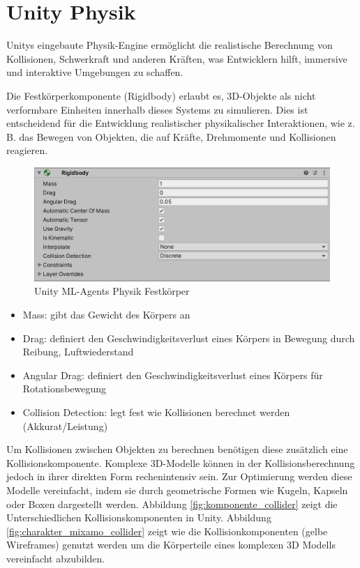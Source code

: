 \section{Unity Physik}
\label{sec:physik}
Unitys eingebaute Physik-Engine ermöglicht die realistische Berechnung von Kollisionen, Schwerkraft und anderen Kräften, was Entwicklern hilft, immersive und interaktive Umgebungen zu schaffen.

Die Festkörperkomponente (Rigidbody) erlaubt es, 3D-Objekte als nicht verformbare Einheiten innerhalb dieses Systems zu simulieren. Dies ist entscheidend für die Entwicklung realistischer physikalischer Interaktionen, wie z. B. das Bewegen von Objekten, die auf Kräfte, Drehmomente und Kollisionen reagieren.

\begin{figure}[H]
  \centering  
  \includegraphics[scale=0.5]{img/komponente_rigidbody.png}
  \caption{Unity ML-Agents Physik Festkörper}
  \label{fig:komponente_rigidbody}
\end{figure}
\begin{itemize}
  \item Mass: gibt das Gewicht des Körpers an
  \item Drag: definiert den Geschwindigkeitsverlust eines Körpers in Bewegung durch Reibung, Luftwiederstand
  \item Angular Drag: definiert den Geschwindigkeitsverlust eines Körpers für Rotationsbewegung
  \item Collision Detection: legt fest wie Kollisionen berechnet werden (Akkurat/Leistung)
 \end{itemize}
 
Um Kollisionen zwischen Objekten zu berechnen benötigen diese zusätzlich eine Kollisionskomponente. Komplexe 3D-Modelle können in der Kollisionsberechnung jedoch in ihrer direkten Form rechenintensiv sein. Zur Optimierung werden diese Modelle vereinfacht, indem sie durch geometrische Formen wie Kugeln, Kapseln oder Boxen dargestellt werden. Abbildung \ref{fig:komponente_collider} zeigt die Unterschiedlichen Kollisionskomponenten in Unity. Abbildung \ref{fig:charakter_mixamo_collider} zeigt wie die Kollisionkomponenten (gelbe Wireframes) genutzt werden um die Körperteile eines komplexen 3D Modells vereinfacht abzubilden.


